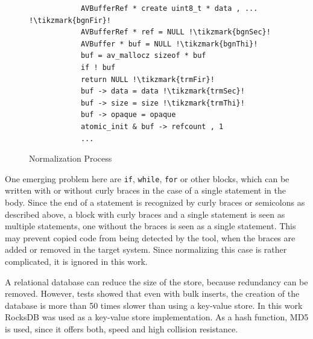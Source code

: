 \begin{figure}[h]
	\centering
	\begin{minipage}{1.2\linewidth}
		\begin{minipage}{0.35\linewidth}
			\scriptsize
			
		\end{minipage}
		\begin{minipage}{0.23\linewidth}
			\scriptsize
			\begin{lstlisting}
			AVBufferRef * create uint8_t * data , ... !\tikzmark{bgnFir}!
			AVBufferRef * ref = NULL !\tikzmark{bgnSec}!
			AVBuffer * buf = NULL !\tikzmark{bgnThi}!
			buf = av_mallocz sizeof * buf
			if ! buf
			return NULL !\tikzmark{trmFir}!
			buf -> data = data !\tikzmark{trmSec}!
			buf -> size = size !\tikzmark{trmThi}!
			buf -> opaque = opaque
			atomic_init & buf -> refcount , 1
			...
			\end{lstlisting}
			
			
		\end{minipage}
	\end{minipage}
	\caption{Normalization Process}\label{fig:normalization}
\end{figure}

One emerging problem here are \texttt{if}, \texttt{while}, \texttt{for} or other blocks, which can be written with or without curly braces in the case of a single statement in the body.
Since the end of a statement is recognized by curly braces or semicolons as described above, a block with curly braces and a single statement is seen as multiple statements, one without the braces is seen as a single statement.
This may prevent copied code from being detected by the tool, when the braces are added or removed in the target system.
Since normalizing this case is rather complicated, it is ignored in this work.

A relational database can reduce the size of the store, because redundancy can be removed.
However, tests showed that even with bulk inserts, the creation of the database is more than 50 times slower than using a key-value store.
In this work RocksDB was used as a key-value store implementation.
As a hash function, MD5 is used, since it offers both, speed and high collision resistance.

